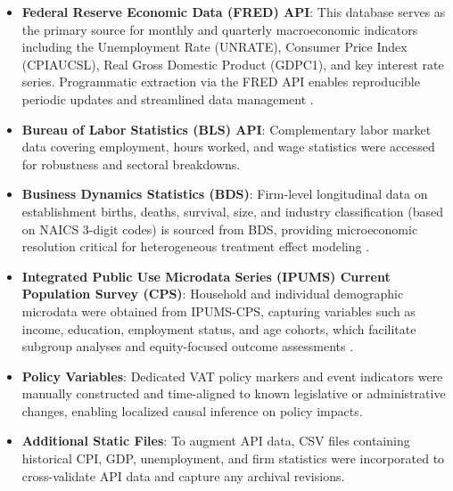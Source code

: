 \begin{itemize}
  \item \textbf{Federal Reserve Economic Data (FRED) API}: This database serves as the primary source for monthly and quarterly macroeconomic indicators including the Unemployment Rate (UNRATE), Consumer Price Index (CPIAUCSL), Real Gross Domestic Product (GDPC1), and key interest rate series. Programmatic extraction via the FRED API enables reproducible periodic updates and streamlined data management \citep{fred2025}.
  
  \item \textbf{Bureau of Labor Statistics (BLS) API}: Complementary labor market data covering employment, hours worked, and wage statistics were accessed for robustness and sectoral breakdowns.

  \item \textbf{Business Dynamics Statistics (BDS)}: Firm-level longitudinal data on establishment births, deaths, survival, size, and industry classification (based on NAICS 3-digit codes) is sourced from BDS, providing microeconomic resolution critical for heterogeneous treatment effect modeling \citep{bds2025}.

  \item \textbf{Integrated Public Use Microdata Series (IPUMS) Current Population Survey (CPS)}: Household and individual demographic microdata were obtained from IPUMS-CPS, capturing variables such as income, education, employment status, and age cohorts, which facilitate subgroup analyses and equity-focused outcome assessments \citep{ipums2025}.

  \item \textbf{Policy Variables}: Dedicated VAT policy markers and event indicators were manually constructed and time-aligned to known legislative or administrative changes, enabling localized causal inference on policy impacts.

  \item \textbf{Additional Static Files}: To augment API data, CSV files containing historical CPI, GDP, unemployment, and firm statistics were incorporated to cross-validate API data and capture any archival revisions.
\end{itemize}

